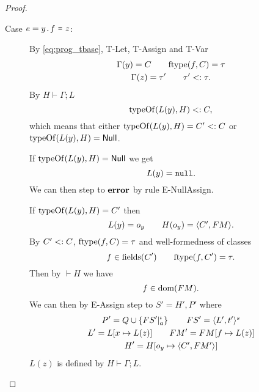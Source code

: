\begin{proof}
\begin{description}
\begin{description}
        \item[Case $e = \mbox{\mdseries$y$\texttt{.}$f$~\texttt{=}~$z$}$:]
          By \eqref{eq:prog_tbase}, {\sc T-Let}, {\sc T-Assign} and {\sc T-Var}
          \begin{equation*}
            \begin{gathered}
              \Gamma(y) = C \quad\quad \mbox{$\mathrm{ftype}$}(f,C) = \tau  \\
              \Gamma(z) = \tau' \quad\quad \tau' <: \tau.
            \end{gathered}
          \end{equation*}
          By $H \vdash \Gamma;L$
          \begin{equation*}
            \mbox{$\mathrm{typeOf}$}(L(y), H) <: C,
          \end{equation*}
          which means that either $\mbox{$\mathrm{typeOf}$}(L(y), H) = C' <: C$ or \\
          $\mbox{$\mathrm{typeOf}$}(L(y), H) = \mbox{$\mathsf{Null}$}$.

          If $\mbox{$\mathrm{typeOf}$}(L(y), H) = \mbox{$\mathsf{Null}$}$ we get
          \begin{equation*}
            L(y) = \mbox{\mdseries\texttt{null}}.
          \end{equation*}
          We can then step to $\mbox{{\bf error}}$ by rule {\sc E-NullAssign}.
          \contradiction

          If $\mbox{$\mathrm{typeOf}$}(L(y), H) = C'$ then
          \begin{equation*}
            L(y) = o_y \quad\quad H(o_y) = \mbox{$\langle C', FM \rangle$}.
          \end{equation*}
          By $C' <: C$, $\mbox{$\mathrm{ftype}$}(f, C) = \tau$ and well-formedness of classes
          \begin{equation*}
            f \in \mbox{$\mathrm{fields}$}(C') \quad\quad \mbox{$\mathrm{ftype}$}(f, C') = \tau.
          \end{equation*}
          Then by $\vdash H$ we have 
          \begin{equation*}
            f \in \mbox{$\mathrm{dom}$}(FM).
          \end{equation*}
          We can then by {\sc E-Assign} step to $S' = H', P'$ where
          \begin{equation*}
            \begin{gathered}
              P' = Q \cup \left\{FS'|_a^\iota \right\} \quad\quad FS' = \mbox{$\langle L',
              t' \rangle^s$} \\
              L' = L[x \mapsto L(z)] \quad\quad FM' = FM[f \mapsto L(z)] \\
              H' = H[o_y \mapsto \mbox{$\langle C', FM' \rangle$}]
            \end{gathered}
          \end{equation*}
          $L(z)$ is defined by $H \vdash \Gamma; L$. \contradiction


\end{description}
\end{description}
\end{proof}
